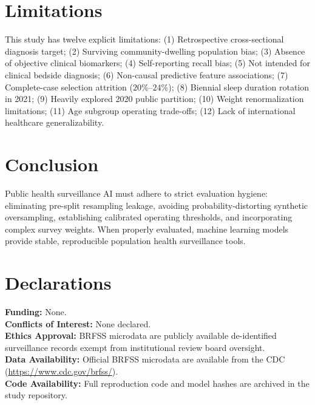 \documentclass[11pt,a4paper]{article}
\begin{document}
\section{Limitations}
This study has twelve explicit limitations: (1) Retrospective cross-sectional diagnosis target; (2) Surviving community-dwelling population bias; (3) Absence of objective clinical biomarkers; (4) Self-reporting recall bias; (5) Not intended for clinical bedside diagnosis; (6) Non-causal predictive feature associations; (7) Complete-case selection attrition ($20\%$--$24\%$); (8) Biennial sleep duration rotation in 2021; (9) Heavily explored 2020 public partition; (10) Weight renormalization limitations; (11) Age subgroup operating trade-offs; (12) Lack of international healthcare generalizability.

\section{Conclusion}
Public health surveillance AI must adhere to strict evaluation hygiene: eliminating pre-split resampling leakage, avoiding probability-distorting synthetic oversampling, establishing calibrated operating thresholds, and incorporating complex survey weights. When properly evaluated, machine learning models provide stable, reproducible population health surveillance tools.

\section*{Declarations}
\noindent \textbf{Funding:} None. \\
\textbf{Conflicts of Interest:} None declared. \\
\textbf{Ethics Approval:} BRFSS microdata are publicly available de-identified surveillance records exempt from institutional review board oversight. \\
\textbf{Data Availability:} Official BRFSS microdata are available from the CDC (\url{https://www.cdc.gov/brfss/}). \\
\textbf{Code Availability:} Full reproduction code and model hashes are archived in the study repository.



\end{document}
